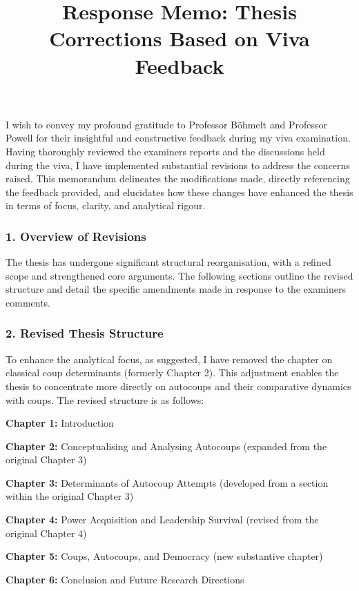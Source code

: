 \documentclass[
  12pt,
  letterpaper,
  DIV=11,
  numbers=noendperiod]{scrartcl}
\title{Response Memo: Thesis Corrections Based on Viva Feedback}
\author{}
\date{}
\begin{document}
\maketitle


I wish to convey my profound gratitude to Professor Böhmelt and
Professor Powell for their insightful and constructive feedback during
my viva examination. Having thoroughly reviewed the examiners reports
and the discussions held during the viva, I have implemented substantial
revisions to address the concerns raised. This memorandum delineates the
modifications made, directly referencing the feedback provided, and
elucidates how these changes have enhanced the thesis in terms of focus,
clarity, and analytical rigour.

\subsubsection{1. Overview of Revisions}\label{overview-of-revisions}

The thesis has undergone significant structural reorganisation, with a
refined scope and strengthened core arguments. The following sections
outline the revised structure and detail the specific amendments made in
response to the examiners comments.

\subsubsection{2. Revised Thesis
Structure}\label{revised-thesis-structure}

To enhance the analytical focus, as suggested, I have removed the
chapter on classical coup determinants (formerly Chapter 2). This
adjustment enables the thesis to concentrate more directly on autocoups
and their comparative dynamics with coups. The revised structure is as
follows:

\textbf{Chapter 1:} Introduction

\textbf{Chapter 2:} Conceptualising and Analysing Autocoups (expanded
from the original Chapter 3)

\textbf{Chapter 3:} Determinants of Autocoup Attempts (developed from a
section within the original Chapter 3)

\textbf{Chapter 4:} Power Acquisition and Leadership Survival (revised
from the original Chapter 4)

\textbf{Chapter 5:} Coups, Autocoups, and Democracy (new substantive
chapter)

\textbf{Chapter 6:} Conclusion and Future Research Directions
\end{document}

